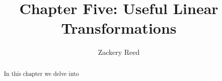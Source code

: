 \documentclass{xourse}
\title{Chapter Five: Useful Linear Transformations}
\author{Zackery Reed}
\begin{document}
\begin{abstract}
    In this chapter we delve into 
\end{abstract}
\maketitle

\sectionstyle
\end{document}
